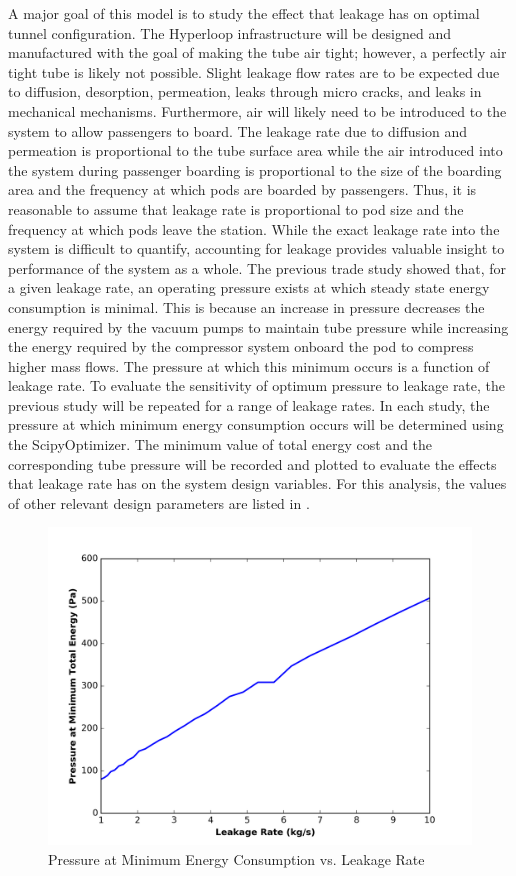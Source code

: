 A major goal of this model is to study the effect that leakage has on optimal tunnel configuration. The Hyperloop infrastructure will be designed and manufactured with the goal of making the tube air tight; however, a perfectly air tight tube is likely not possible. Slight leakage flow rates are to be expected due to diffusion, desorption, permeation, leaks through micro cracks, and leaks in mechanical mechanisms. Furthermore, air will likely need to be introduced to the system to allow passengers to board. The leakage rate due to diffusion and permeation is proportional to the tube surface area while the air introduced into the system during passenger boarding is proportional to the size of the boarding area and the frequency at which pods are boarded by passengers. Thus, it is reasonable to assume that leakage rate is proportional to pod size and the frequency at which pods leave the station. While the exact leakage rate into the system is difficult to quantify, accounting for leakage provides valuable insight to performance of the system as a whole.
The previous trade study showed that, for a given leakage rate, an operating pressure exists at which steady state energy consumption is minimal. This is because an increase in pressure decreases the energy required by the vacuum pumps to maintain tube pressure while increasing the energy required by the compressor system onboard the pod to compress higher mass flows. The pressure at which this minimum occurs is a function of leakage rate. To evaluate the sensitivity of optimum pressure to leakage rate, the previous study will be repeated for a range of leakage rates. In each study, the pressure at which minimum energy consumption occurs will be determined using the ScipyOptimizer. The minimum value of total energy cost and the corresponding tube pressure will be recorded and plotted to evaluate the effects that leakage rate has on the system design variables. For this analysis, the values of other relevant design parameters are listed in .
\begin{figure}
	\centering
	\includegraphics{../../images/graphs/leakage_trades/leakage_vs_pressure.png}
	\caption{Pressure at Minimum Energy Consumption vs. Leakage Rate}
	\label{fig:pres_vs_leakage_rate}
\end{figure}
